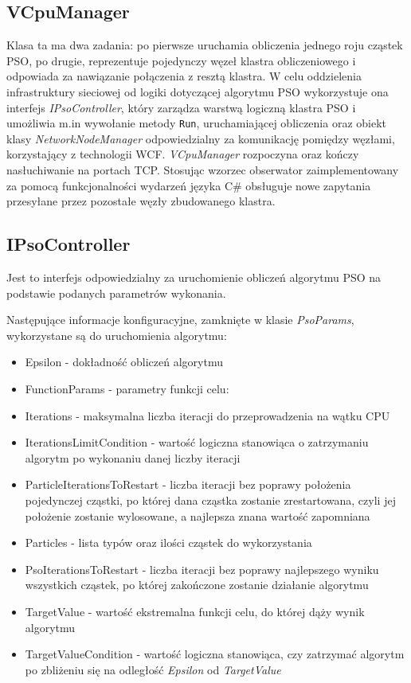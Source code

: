 \documentclass[12pt, twoside, openany, abstract=on]{report}
\theoremstyle{definition}
\begin{document}
\subsection{VCpuManager}
Klasa ta ma dwa zadania: 
po pierwsze uruchamia obliczenia jednego roju cząstek PSO, po drugie, reprezentuje pojedynczy węzeł klastra obliczeniowego i odpowiada za nawiązanie połączenia z resztą klastra. W celu oddzielenia infrastruktury sieciowej od logiki dotyczącej algorytmu PSO wykorzystuje ona interfejs \textit{IPsoController}, który zarządza warstwą logiczną klastra PSO i umożliwia m.in wywołanie metody \texttt{Run}, uruchamiającej obliczenia oraz obiekt klasy \textit{NetworkNodeManager} odpowiedzialny za komunikację pomiędzy węzłami, korzystający z technologii WCF. \textit{VCpuManager} rozpoczyna oraz kończy nasłuchiwanie na portach TCP. Stosując wzorzec obserwator zaimplementowany za pomocą funkcjonalności wydarzeń języka C\# obsługuje nowe zapytania przesyłane przez pozostałe węzły zbudowanego klastra.

\subsection{IPsoController}
Jest to interfejs odpowiedzialny za uruchomienie obliczeń algorytmu PSO na podstawie podanych parametrów wykonania.

Następujące informacje konfiguracyjne, zamknięte w klasie \textit{PsoParams}, wykorzystane są do uruchomienia algorytmu:  

\begin{itemize}
	\item Epsilon - dokładność obliczeń algorytmu
	\item FunctionParams - parametry funkcji celu: 
	
	\item Iterations - maksymalna liczba iteracji do przeprowadzenia na wątku CPU
	\item IterationsLimitCondition - wartość logiczna stanowiąca o zatrzymaniu algorytm po wykonaniu danej liczby iteracji
	\item ParticleIterationsToRestart - liczba iteracji bez poprawy położenia pojedynczej cząstki, po której dana cząstka zostanie zrestartowana, czyli jej położenie zostanie wylosowane, a najlepsza znana wartość zapomniana
	\item Particles - lista typów oraz ilości cząstek do wykorzystania
	\item PsoIterationsToRestart - liczba iteracji bez poprawy najlepszego wyniku wszystkich cząstek, po której zakończone zostanie działanie algorytmu
	\item TargetValue - wartość ekstremalna funkcji celu, do której dąży wynik algorytmu
	\item TargetValueCondition - wartość logiczna stanowiąca, czy zatrzymać algorytm po zbliżeniu się na odległość \emph{Epsilon} od \emph{TargetValue}
\end{itemize}
\end{document}
